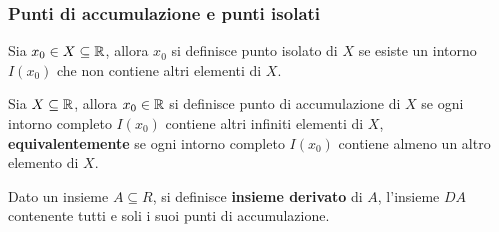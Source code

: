 \documentclass{book}     %
\begin{document}
\subsubsection{Punti di accumulazione e punti isolati}
\begin{boxdef}
    Sia $x_0\in X\subseteq\mathbb{R}$, allora $x_0$ si definisce punto isolato di $X$ se esiste un intorno $I(x_0)$ che non contiene altri elementi di $X$.
\end{boxdef}
\begin{boxdef}
    Sia $ X\subseteq\mathbb{R}$, allora $x_0\in \mathbb{R}$ si definisce punto di accumulazione di $X$ se ogni intorno completo $I(x_0)$ contiene altri infiniti elementi di $X$,\\
    \textbf{equivalentemente} se ogni intorno completo $I(x_0)$ contiene almeno un altro elemento di $X$.
\end{boxdef}
\begin{boxdef}
    Dato un insieme $A\subseteq R$, si definisce \textbf{insieme derivato} di $A$, l'insieme $DA$ contenente tutti e soli i suoi punti di accumulazione.
\end{boxdef}
\end{document}
